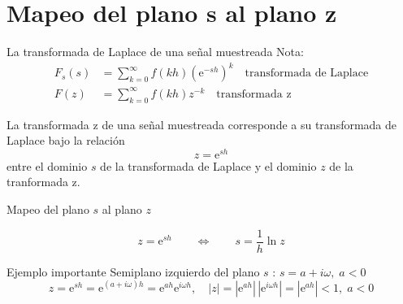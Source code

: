 \documentclass[presentation,aspectratio=169]{beamer}
\begin{document}
\section{Mapeo del plano s al plano z}
\label{sec:orgc493860}
\begin{frame}[label={sec:org3f29dd1}]{La transformada de Laplace de una señal muestreada}
Nota:
\begin{align*}
F_s(s) &=  \sum_{k=0}^{\infty} f(kh) \left(\mathrm{e}^{-sh}\right)^k\quad \text{transformada de Laplace}\\
F(z) &= \sum_{k=0}^{\infty} f(kh) z^{-k} \quad \text{transformada z}
\end{align*}

\begin{tcolorbox}
La transformada z de una señal muestreada corresponde a su transformada de Laplace bajo la relación 
\[ z = \mathrm{e}^{sh}\]
entre el dominio $s$ de la transformada de Laplace y el dominio $z$ de la tranformada z.
\end{tcolorbox}
\end{frame}



\begin{frame}[label={sec:orgcadcc63}]{Mapeo del plano \(s\) al plano \(z\)}
\begin{tcolorbox}
\[ z = \mathrm{e}^{sh} \qquad \Leftrightarrow \qquad  s = \frac{1}{h} \ln z\]
\end{tcolorbox}

\alert{Ejemplo importante} Semiplano izquierdo del plano \(s\) : \(s = a + i\omega, \; a < 0\)
\[ z = \mathrm{e}^{sh} = \mathrm{e}^{(a + i\omega)h} = \mathrm{e}^{ah} \mathrm{e}^{i\omega h}, \quad |z| = |\mathrm{e}^{ah}|\, |\mathrm{e}^{i\omega h}| = |\mathrm{e}^{ah}| < 1, \; a < 0\]
\end{frame}
\end{document}
